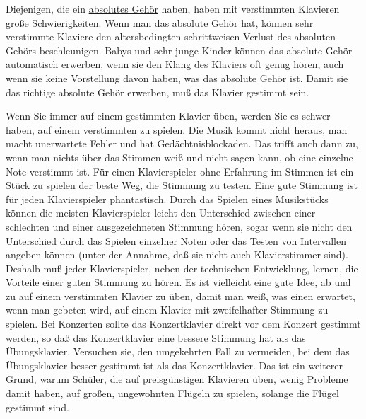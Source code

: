 Diejenigen, die ein \hyperlink{c1iii12}{absolutes Gehör} haben, haben mit verstimmten Klavieren große Schwierigkeiten.
Wenn man das absolute Gehör hat, können sehr verstimmte Klaviere den altersbedingten schrittweisen Verlust des absoluten Gehörs beschleunigen.
Babys und sehr junge Kinder können das absolute Gehör automatisch erwerben, wenn sie den Klang des Klaviers oft genug hören, auch wenn sie keine Vorstellung davon haben, was das absolute Gehör ist.
Damit sie das richtige absolute Gehör erwerben, muß das Klavier gestimmt sein.

Wenn Sie immer auf einem gestimmten Klavier üben, werden Sie es schwer haben, auf einem verstimmten zu spielen.
Die Musik kommt nicht heraus, man macht unerwartete Fehler und hat Gedächtnisblockaden.
Das trifft auch dann zu, wenn man nichts über das Stimmen weiß und nicht sagen kann, ob eine einzelne Note verstimmt ist.
Für einen Klavierspieler ohne Erfahrung im Stimmen ist ein Stück zu spielen der beste Weg, die Stimmung zu testen.
Eine gute Stimmung ist für jeden Klavierspieler phantastisch.
Durch das Spielen eines Musikstücks können die meisten Klavierspieler leicht den Unterschied zwischen einer schlechten und einer ausgezeichneten Stimmung hören, sogar wenn sie nicht den Unterschied durch das Spielen einzelner Noten oder das Testen von Intervallen angeben können (unter der Annahme, daß sie nicht auch Klavierstimmer sind).
Deshalb muß jeder Klavierspieler, neben der technischen Entwicklung, lernen, die Vorteile einer guten Stimmung zu hören.
Es ist vielleicht eine gute Idee, ab und zu auf einem verstimmten Klavier zu üben, damit man weiß, was einen erwartet, wenn man gebeten wird, auf einem Klavier mit zweifelhafter Stimmung zu spielen.
Bei Konzerten sollte das Konzertklavier direkt vor dem Konzert gestimmt werden, so daß das Konzertklavier eine bessere Stimmung hat als das Übungsklavier.
Versuchen sie, den umgekehrten Fall zu vermeiden, bei dem das Übungsklavier besser gestimmt ist als das Konzertklavier.
Das ist ein weiterer Grund, warum Schüler, die auf preisgünstigen Klavieren üben, wenig Probleme damit haben, auf großen, ungewohnten Flügeln zu spielen, solange die Flügel gestimmt sind.

